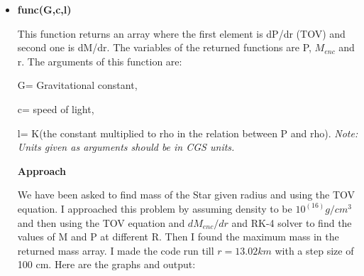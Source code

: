 \documentclass{article}
\begin{document}
\begin{itemize}
\item{\textbf{func(G,c,l)}}\vspace{0.2em}

This function returns an array where the first element is dP/dr (TOV) and second one is dM/dr. The variables of the returned functions are P, $M_{enc}$ and r.
    The arguments of this function are:
      \vspace{0.2em}
      
        G= Gravitational constant,
          \vspace{0.2em}
          
        c= speed of light,
          \vspace{0.2em}
          
        l= K(the constant multiplied to rho in the relation between P and rho).
          \vspace{0.2em}
        \emph{Note: Units given as arguments should be in CGS units.}
  
  \vspace{0.2em}
  
 \textbf{Approach}
  
We have been asked to find mass of the Star given radius and using the TOV equation. I approached this problem by assuming density to be $10^(16)g/cm^3$ and then using the TOV equation and $dM_{enc}/dr $ and RK-4 solver to find the values of M and P at different R. Then I found the maximum mass in the returned mass array. I made the code run till $r=13.02 km$ with a step size of 100 cm. Here are the graphs and output:



\end{itemize}
\end{document}
